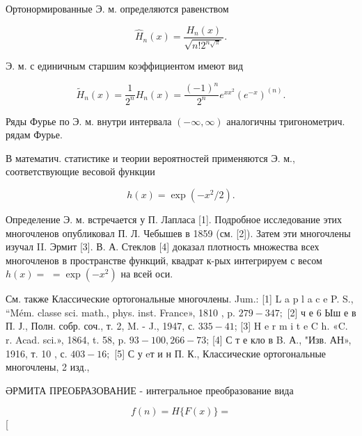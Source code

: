 \documentclass[10pt]{article}
\begin{document}
Ортонормированные Э. м. определяются равенством



\[

\hat{H}_{n}(x)=\frac{H_{n}(x)}{\sqrt{n ! 2^{n \sqrt{\pi}}}} .

\]



Э. м. с единичным старшим коэффициентом имеют вид



\[

\tilde{H}_{n}(x)=\frac{1}{2^{n}} H_{n}(x)=\frac{(-1)^{n}}{2^{n}} e^{x x^{2}}\left(e^{-x}\right)^{(n)} .

\]



Ряды Фурье по Э. м. внутри интервала $(-\infty, \infty)$ аналогичны тригонометрич. рядам Фурье.



В математич. статистике и теории вероятностей применяются Э. м., соответствующие весовой функции



\[

h(x)=\exp \left(-x^{2} / 2\right) .

\]



Определение Э. м. встречается у П. Лапласа [1]. Подробное исследование этих многочленов опубликовал П. Л. Чебышев в 1859 (см. [2]). Затем эти многочлены изучал II. Эрмит [3]. В. А. Стеклов [4] доказал плотность множества всех многочленов в пространстве функций, квадрат к-рых интегрируем с весом $h(x)=$ $=\exp \left(-x^{2}\right)$ на всей оси.



См. также Классические ортогональные многочлены. Jum.: [1] L a p l a c e P. S., “Mém. classe sci. math., phys. inst. France», 1810 , p. $279-347 ;$ [2] ч е 6 Ыш е в П. Ј., Полн. собр. соч., т. 2, M. - J., 1947, с. $335-41$; [3] H e r m i t e C h. «C. r. Acad. sci.», 1864, t. 58, p. $93-100,266-73$; [4] С т е кло в B. А., "Изв. АН», 1916, т. 10 , с. $403-16 ;$ [5] С у eт и н П. К., Классические ортогональные многочлены, 2 изд.,



ӘРМИТА ПРЕОБРАЗОВАНИЕ - интегральное преобразование вида



\[

f(n)=H\{F(x)\}=

\][
\end{document}
